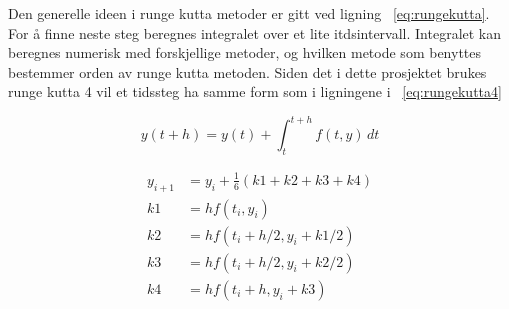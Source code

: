 \documentclass[a4paper, 12pt]{article}
\begin{document}
 Den generelle ideen i runge kutta metoder er gitt ved ligning ~\ref{eq:rungekutta}. For å finne neste steg beregnes integralet over et lite itdsintervall. Integralet kan beregnes numerisk med forskjellige metoder, og hvilken metode som benyttes bestemmer orden av runge kutta metoden. Siden det i dette prosjektet brukes runge kutta 4 vil et tidssteg ha samme form som i ligningene i  ~\ref{eq:rungekutta4}
 
 \begin{equation}
 \label{eq:rungekutta}
 y(t+h) = y(t) + \int_t^{t+h} f(t,y) \, dt
 \end{equation}
 
 \begin{equation}
 \label{eq:rungekutta4}
 	\begin{aligned}
 	y_{i+1} &= y_i + \frac{1}{6}(k1 + k2 + k3 + k4)\\
 	k1 &= hf(t_i, y_i)\\
 	k2 &= hf(t_i + h/2, y_i + k1/2)\\
 	k3 &= hf(t_i + h/2, y_i + k2/2)\\
 	k4& = hf(t_i + h, y_i + k3)\\
 	\end{aligned}
 \end{equation}
 
\end{document}
